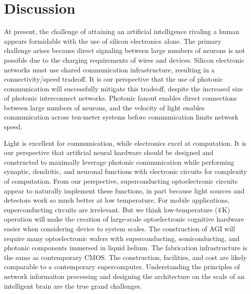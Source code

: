 \documentclass[twocolumn]{article}
\begin{document}
\section{\label{sec:discussion}Discussion}
At present, the challenge of attaining an artificial intelligence rivaling a human appears formidable with the use of silicon electronics alone. The primary challenge arises because direct signaling between large numbers of neurons is not possible due to the charging requirements of wires and devices. Silicon electronic networks must use shared communication infrastructure, resulting in a connectivity/speed tradeoff. It is our perspective that the use of photonic communication will successfully mitigate this tradeoff, despite the increased size of photonic interconnect networks. Photonic fanout enables direct connections between large numbers of neurons, and the velocity of light enables communication across ten-meter systems before communication limits network speed. 

Light is excellent for communication, while electronics excel at computation. It is our perspective that artificial neural hardware should be designed and constructed to maximally leverage photonic communication while performing synaptic, dendritic, and neuronal functions with electronic circuits for complexity of computation. From our perspective, superconducting optoelectronic circuits appear to naturally implement these functions, in part because light sources and detectors work so much better at low temperature. For mobile applications, superconducting circuits are irrelevant. But we think low-temperature (4\,K) operation will make the creation of large-scale optoelectronic cognitive hardware easier when considering device to system scales. The construction of AGI will require many optoelectronic wafers with superconducting, semiconducting, and photonic components immersed in liquid helium. The fabrication infrastructure is the same as contemporary CMOS. The construction, facilities, and cost are likely comparable to a contemporary supercomputer. Understanding the principles of network informaiton processing and designing the architecture on the scale of an intelligent brain are the true grand challenges.
\end{document}
